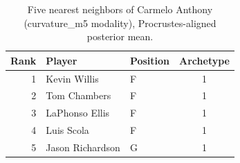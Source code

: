 \begin{table}[htbp]
  \centering\small
  \begin{tabular}{rllc}
    \toprule
    Rank & Player & Position & Archetype \\
    \midrule
    1 & Kevin Willis & F & 1 \\
    2 & Tom Chambers & F & 1 \\
    3 & LaPhonso Ellis & F & 1 \\
    4 & Luis Scola & F & 1 \\
    5 & Jason Richardson & G & 1 \\
    \bottomrule
  \end{tabular}
  \caption{Five nearest neighbors of Carmelo Anthony (curvature_m5 modality), Procrustes-aligned posterior mean.}
  \label{tab:Carmelo_Anthony_neighbors_curvature_m5}
\end{table}

